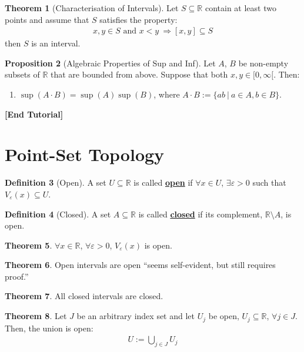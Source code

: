 \documentclass[reqno,11pt]{amsart}
\theoremstyle{definition}
\newtheorem{theorem}{Theorem}
\newtheorem{prop}[theorem]{Proposition}
\theoremstyle{definition}
\newtheorem{definition}[theorem]{Definition}
\theoremstyle{remark}
\newcommand{\R}{\mathbb{R}}
\newcommand{\eps}{\varepsilon}
\newcommand{\dfn}[1]{\underline{\textbf{#1}}}
\begin{document}
\begin{theorem}[Characterisation of Intervals]
	Let $S \subseteq \R$ contain at least two points and assume that $S$ satisfies the property:
	\begin{align} 	
		x, y \in S \text{ and } x < y\ \Rightarrow [x,y] \subseteq S	
	\end{align}
	then $S$ is an interval.
\end{theorem}

\begin{prop}[Algebraic Properties of Sup and Inf]
	Let $A$, $B$ be non-empty subsets of $\R$ that are bounded from above. Suppose that both $x, y \in [0, \infty[$. Then: 
	\begin{enumerate}[noitemsep]
		\item $\sup(A \cdot B) = \sup(A) \sup(B)$, where $A \cdot B := \{ ab\ |\ a \in A, b \in B \}$.
	\end{enumerate}
\end{prop}
\begin{center}
	\textbf{[End Tutorial]}
\end{center}

\section{Point-Set Topology}
\begin{definition}[Open]
	A set $U \subseteq \R$ is called \dfn{open} if $\forall x \in U$, $\exists \varepsilon > 0$ such that $V_\varepsilon(x) \subseteq U$.
\end{definition}
\begin{definition}[Closed]
	A set $A \subseteq \R$ is called \dfn{closed} if its complement, $\R \setminus A$, is open.
\end{definition}

\begin{theorem}
	$\forall  x \in \R$, $\forall \eps > 0$, $V_\eps(x) $ is open.	
\end{theorem}

\begin{theorem}
Open intervals are open ``seems self-evident, but still requires proof.'' 	
\end{theorem}
\begin{theorem}
All closed intervals are closed. 	
\end{theorem}
\begin{theorem}
	Let $J$ be an arbitrary index set and let $U_j$ be open, $U_j \subseteq \R$, $\forall j \in J$. Then, the union is open:
	\begin{align}
		U := \bigcup_{j \in J} U_j 	
	\end{align}
\end{theorem}
\end{document}

